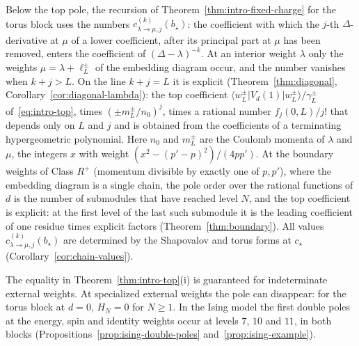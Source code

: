 \documentclass[twoside,10pt]{article}
\numberwithin{equation}{section}
\theoremstyle{slbody}
\theoremstyle{definition}
\theoremstyle{remark}
\begin{document}
Below the top pole, the recursion of Theorem~\ref{thm:intro-fixed-charge}
for the torus block uses the numbers \(c^{(k)}_{\lambda\to\mu,j}(b_\star)\): the
coefficient with which the \(j\)-th \(\Delta\)-derivative at \(\mu\) of a lower
coefficient, after its principal part at \(\mu\) has been removed, enters the
coefficient of \((\Delta-\lambda)^{-k}\).  At an
interior weight \(\lambda\) only the weights \(\mu=\lambda+\ell^\pm_L\) of the
embedding diagram occur, and the number vanishes when \(k+j>L\).  On the line
\(k+j=L\) it is explicit (Theorem~\ref{thm:diagonal},
Corollary~\ref{cor:diagonal-lambda}): the top coefficient
\(\langle w^\pm_L|V_d(1)|w^\pm_L\rangle/\gamma^\pm_L\) of~\eqref{eq:intro-top}, times
\((\pm m^\pm_L/n_0)^j\), times a rational number \(f_j(0,L)/j!\) that depends
only on \(L\) and \(j\) and is obtained from the coefficients of a terminating
hypergeometric polynomial.  Here \(n_0\)
and \(m^\pm_L\) are the Coulomb momenta of \(\lambda\) and \(\mu\), the integers
\(x\) with weight \((x^2-(p'-p)^2)/(4pp')\).  At the
boundary weights of Class \(R^+\) (momentum divisible by exactly one of
\(p,p'\)), where the embedding diagram is a single chain, the pole order over
the rational functions of \(d\) is the number of submodules that have reached
level \(N\), and the top coefficient is explicit: at the first level of the last
such submodule it is the leading coefficient of one residue times explicit
factors (Theorem~\ref{thm:boundary}).  All values \(c^{(k)}_{\lambda\to\mu,j}(b_\star)\)
are determined by the Shapovalov and torus forms at \(c_\star\)
(Corollary~\ref{cor:chain-values}).

The equality in Theorem~\ref{thm:intro-top}(i) is guaranteed for
indeterminate external weights.  At specialized external weights the pole can
disappear:
for the torus block at \(d=0\), \(H_N=0\) for \(N\geq1\).  In the Ising model the first double poles at the energy, spin and
identity weights occur at levels \(7\), \(10\) and \(11\), in both blocks
(Propositions~\ref{prop:ising-double-poles} and~\ref{prop:ising-example}).
\end{document}
